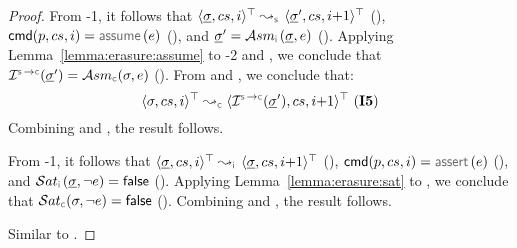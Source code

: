 \begin{proof}
\noindent {}
From \hyp{1}, it follows that $\abssemrule{\istate, \cs, i}{\istate', \cs, i{+}1}{\top}{\top}{\symbolic}$ (), 
$\ccmd[\prog][\cs]{i}  = \assume(\jsilexpr)$ (), and $\istate' = \absassume{\instrumented}(\istate, \jsilexpr)$ (). 
Applying Lemma~\ref{lemma:erasure:assume} to 
\hyp{2} and , we conclude that 
$\interpret{\symbconc}{}(\istate') = \absassume{\concrete}(\jstate, \jsilexpr)$ (). 
From  and , we conclude that: 
 $$\abssemrule{\jstate, \cs, i}{\interpret{\symbconc}{}(\istate'), \cs, i{+}1}{\top}{\top}{\concrete} \text{ (\ieq{5})}$$
  Combining   and , the result follows.
 \vspace{5pt}


\noindent {}
From \hyp{1}, it follows that $\abssemrule{\istate, \cs, i}{\istate, \cs, i{+}1}{\top}{\top}{\instrumented}$ (), 
$ \ccmd[\prog][\cs]{i}  = \jassert(\jsilexpr)$ (), and $\abssat{\instrumented}(\istate, \neg \jsilexpr) = \jfalse$ (). 
Applying Lemma~\ref{lemma:erasure:sat} to , we conclude that 
$\abssat{\concrete}(\jstate, \neg \jsilexpr) = \jfalse$ (). 
Combining  and , the result follows. 
 \vspace{5pt}

\noindent {}
Similar to . 
\end{proof}


